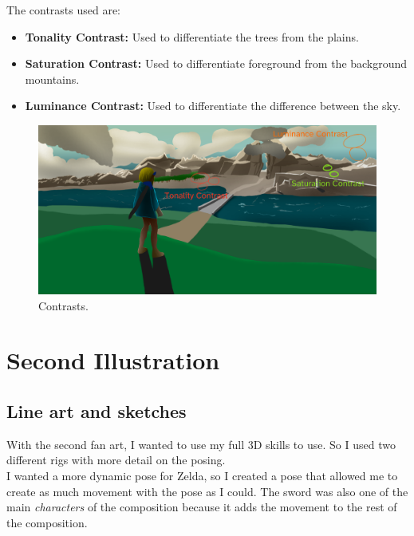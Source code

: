\documentclass{cup-pan}
\begin{document}
            The contrasts used are:
            \begin{itemize}
                \item \textbf{Tonality Contrast:} Used to differentiate the trees from the plains.
                \item \textbf{Saturation Contrast:} Used to differentiate foreground from the background mountains. 
                \item \textbf{Luminance Contrast:} Used to differentiate the difference between the sky. 
            \end{itemize}

            \begin{figure}[H]
                \includegraphics[width=\textwidth]{Imagenes/Fanart1/Analysis/contraste.png}
                \caption{Contrasts.}
            \end{figure}

\newpage
\newpage
\section{Second Illustration}

    \subsection{Line art and sketches}

        With the second fan art, I wanted to use my full 3D skills to use. So I used two different rigs with more detail on the posing. \\
        
        I wanted a more dynamic pose for Zelda, so I created a pose that allowed me to create as much movement with the pose as I could. The sword was also one of the main \textit{characters} of the composition because it adds the movement to the rest of the composition.\\
\end{document}
